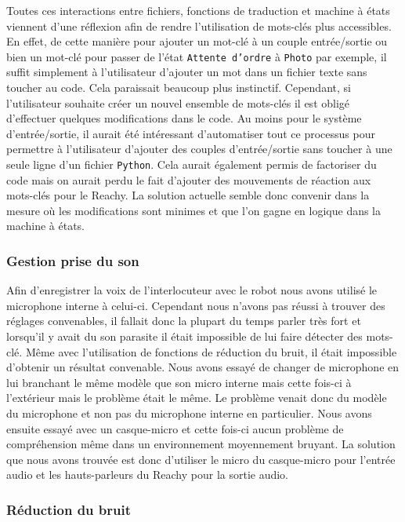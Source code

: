 \documentclass[a4paper,french]{article}
\begin{document}
Toutes ces interactions entre fichiers, fonctions de traduction et machine à états viennent d'une réflexion afin de rendre l'utilisation de mots-clés plus accessibles. En effet, de cette manière pour ajouter un mot-clé à un couple entrée/sortie ou bien un mot-clé pour passer de l'état \texttt{Attente d'ordre} à \texttt{Photo} par exemple, il suffit simplement à l'utilisateur d'ajouter un mot dans un fichier texte sans toucher au code. Cela paraissait beaucoup plus instinctif. Cependant, si l'utilisateur souhaite créer un nouvel ensemble de mots-clés il est obligé d'effectuer quelques modifications dans le code. Au moins pour le système d'entrée/sortie, il aurait été intéressant d'automatiser tout ce processus pour permettre à l'utilisateur d'ajouter des couples d'entrée/sortie sans toucher à une seule ligne d'un fichier \texttt{Python}. Cela aurait également permis de factoriser du code mais on aurait perdu le fait d'ajouter des mouvements de réaction aux mots-clés pour le Reachy. La solution actuelle semble donc convenir dans la mesure où les modifications sont minimes et que l'on gagne en logique dans la machine à états. 

\subsubsection{Gestion prise du son}
Afin d'enregistrer la voix de l'interlocuteur avec le robot nous avons utilisé le microphone interne à celui-ci. Cependant nous n'avons pas réussi à trouver des réglages convenables, il fallait donc la plupart du temps parler très fort et lorsqu'il y avait du son parasite il était impossible de lui faire détecter des mots-clé. Même avec l'utilisation de fonctions de réduction du bruit, il était impossible d'obtenir un résultat convenable. Nous avons essayé de changer de microphone en lui branchant le même modèle que son micro interne mais cette fois-ci à l'extérieur mais le problème était le même. Le problème venait donc du modèle du microphone et non pas du microphone interne en particulier. Nous avons ensuite essayé avec un casque-micro et cette fois-ci aucun problème de compréhension même dans un environnement moyennement bruyant. La solution que nous avons trouvée est donc d'utiliser le micro du casque-micro pour l'entrée audio et les hauts-parleurs du Reachy pour la sortie audio. 

\subsubsection{Réduction du bruit}
\end{document}
